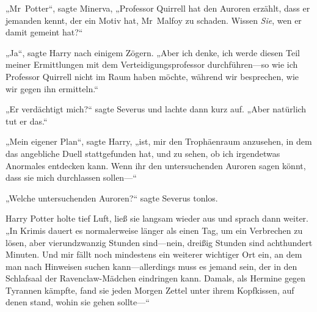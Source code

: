 „Mr~Potter“, sagte Minerva, „Professor Quirrell hat den Auroren erzählt, dass er jemanden kennt, der ein Motiv hat, Mr~Malfoy zu schaden. Wissen \emph{Sie}, wen er damit gemeint hat?“

„Ja“, sagte Harry nach einigem Zögern. „Aber ich denke, ich werde diesen Teil meiner Ermittlungen mit dem Verteidigungsprofessor durchführen—so wie ich Professor Quirrell nicht im Raum haben möchte, während wir besprechen, wie wir gegen ihn ermitteln.“

„Er verdächtigt mich?“ sagte Severus und lachte dann kurz auf. „Aber natürlich tut er das.“

„Mein eigener Plan“, sagte Harry, „ist, mir den Trophäenraum anzusehen, in dem das angebliche Duell stattgefunden hat, und zu sehen, ob ich irgendetwas Anormales entdecken kann. Wenn ihr den untersuchenden Auroren sagen könnt, dass sie mich durchlassen sollen—“

„Welche untersuchenden Auroren?“ sagte Severus tonlos.

Harry Potter holte tief Luft, ließ sie langsam wieder aus und sprach dann weiter.
„In Krimis dauert es normalerweise länger als einen Tag, um ein Verbrechen zu lösen, aber vierundzwanzig Stunden sind—nein, dreißig Stunden sind achthundert Minuten. Und mir fällt noch mindestens ein weiterer wichtiger Ort ein, an dem man nach Hinweisen suchen kann—allerdings muss es jemand sein, der in den Schlafsaal der Ravenclaw-Mädchen eindringen kann. Damals, als Hermine gegen Tyrannen kämpfte, fand sie jeden Morgen Zettel unter ihrem Kopfkissen, auf denen stand, wohin sie gehen sollte—“

